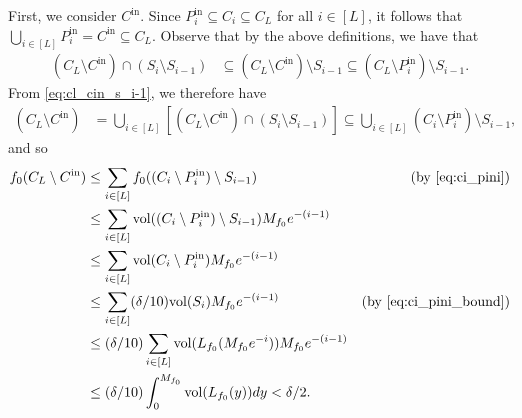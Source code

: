 \documentclass[final,12pt]{colt2018}
\newtheorem{informal theorem}[theorem]{Theorem (informal statement)}
\newcommand{\pini}{P^{\mathrm{in}}_i}
\newcommand{\cin}{C^\mathrm{in}}
\newcommand{\vol}{\mathrm{vol}}
\begin{document}
First, we consider $\cin$.
Since $\pini \subseteq C_i \subseteq C_L$ for all $i \in [L]$, it follows that $\bigcup_{i \in [L]} \pini = \cin \subseteq C_L$.
Observe that by the above definitions, we have that
\begin{align}
(C_L \setminus \cin) \cap (S_i \setminus S_{i-1})
&\subseteq (C_L \setminus \cin) \setminus S_{i-1} \subseteq (C_L \setminus \pini) \setminus S_{i-1} \label{eq:cl_cin_s_i-1}.
\end{align}
From \eqref{eq:cl_cin_s_i-1}, we therefore have
\begin{align}
(C_L \setminus \cin)
&= \bigcup_{i \in [L]} \left[ (C_L \setminus \cin) \cap (S_i \setminus S_{i-1}) \right] \subseteq \bigcup_{i \in [L]} (C_i \setminus \pini) \setminus S_{i-1}, \label{eq:ci_pini}
\end{align}
and so
\begin{align}
f_0(C_L \setminus \cin)
&\leq \sum_{i\in [L]} f_0((C_i \setminus \pini) \setminus S_{i-1}) & \text{(by \eqref{eq:ci_pini})} \notag \\
&\leq \sum_{i \in [L]} \vol((C_i \setminus \pini) \setminus S_{i-1}) M_{f_0} e^{-(i-1)} \notag \\
&\leq \sum_{i \in [L]} \vol(C_i \setminus \pini) M_{f_0} e^{-(i-1)} \notag \\
&\leq \sum_{i \in [L]} (\delta/10) \vol(S_i) M_{f_0} e^{-(i-1)} & \text{(by \eqref{eq:ci_pini_bound})} \notag \\
&\leq (\delta/10) \sum_{i \in [L]} \vol(L_{f_0}(M_{f_0} e^{-i})) M_{f_0} e^{-(i-1)} \notag \\
&\leq (\delta /10) \int_0^{M_{f_0}} \vol(L_{f_0}(y)) dy < \delta/2. \label{eq:imp_f0_Cp_T}
\end{align}
\end{document}
